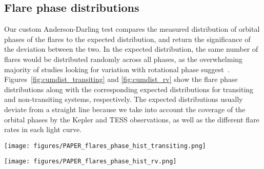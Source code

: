 \documentclass[twocolumn]{aastex631}
\begin{document}
\subsection{Flare phase distributions}
\label{sec:results:phasedist}
Our custom Anderson-Darling test compares the measured distribution of orbital phases of the flares to the expected distribution, and return the significance of the deviation between the two. In the expected distribution, the same number of flares would be distributed randomly across all phases, as the overwhelming majority of studies looking for variation with rotational phase suggest~\citep[e.g.]{doyle2018investigating,howard2021evryflare}. Figures~\ref{fig:cumdist_transiting} and \ref{fig:cumdist_rv} show the flare phase distributions along with the corresponding expected distributions for transiting and non-transiting systems, respectively. The expected distributions usually deviate from a straight line because we take into account the coverage of the orbital phases by the Kepler and TESS observations, as well as the different flare rates in each light curve.

\begin{figure*}[ht!]
    \begin{centering}
        \texttt{[image: figures/PAPER\_flares\_phase\_hist\_transiting.png]}
        \caption{
            Cumulative distributions of orbital phases of flares in the \textit{transiting} planet hosts observed by Kepler and TESS, sorted by number of flares from top to bottom. The bisector line is dotted, the expected distribution is solid blue, and the observed distribution is solid black. Phase zero corresponds to the transit mid-time of the planet. 
        }
        \label{fig:cumdist_transiting}
    \end{centering}
\end{figure*}

\begin{figure*}[ht!]
    \begin{centering}
        \texttt{[image: figures/PAPER\_flares\_phase\_hist\_rv.png]}
        \caption{
            Cumulative distributions of orbital phases of flares in the \textit{non-transiting} planet hosts observed by Kepler and TESS, sorted by number of flares from top to bottom. The bisector line is dotted, the expected distribution is solid blue, and the observed distribution is solid black. Phase zero is chosen arbitrarily. 
        }
        \label{fig:cumdist_rv}
    \end{centering}
\end{figure*}
\end{document}
